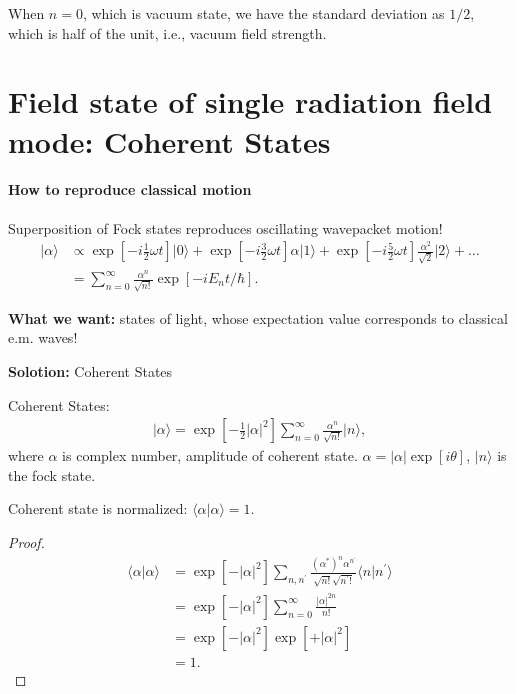 \documentclass[../../note.tex]{subfiles}
\begin{document}
When $n = 0$, which is vacuum state, we have the standard deviation as $1/2$, which is half of the unit, i.e., vacuum field strength.

\section{Field state of single radiation field mode: Coherent States}
\paragraph{How to reproduce classical motion}
Superposition of Fock states reproduces oscillating wavepacket motion! 
\begin{align}
    \vert \alpha \rangle 
    &\propto \exp[-i\frac{1}{2} \omega t] \vert 0 \rangle +  \exp[-i\frac{3}{2} \omega t] \alpha \vert 1 \rangle +
    \exp[-i\frac{5}{2} \omega t] \frac{\alpha^2}{\sqrt{2}}\vert 2 \rangle + \dots \\
    &= \sum_{n=0}^{\infty} \frac{\alpha^n}{\sqrt{n !}} \exp\left[-i E_n t / \hbar \right].
\end{align}

\textbf{What we want:} states of light, whose expectation value corresponds to classical e.m. waves!

\textbf{Solotion:} Coherent States
\begin{definition}
    Coherent States:
    \begin{align}
        \vert \alpha \rangle = \exp\left[-\frac{1}{2} \vert \alpha \vert^2 \right] \sum_{n=0}^{\infty} \frac{\alpha^n}{\sqrt{n !}} \vert n \rangle,
    \end{align}
    where $\alpha$ is complex number, amplitude of coherent state. $\alpha = \vert \alpha \vert \exp[i \theta]$, $\vert n \rangle$ is the fock state.
\end{definition}

\begin{lemma}
    Coherent state is normalized: $\langle \alpha \vert \alpha \rangle = 1$.
\end{lemma}
\begin{proof}
    \begin{align}
        \langle \alpha \vert \alpha \rangle
        &= \exp\left[- \vert \alpha \vert^2 \right] \sum_{n, n^\prime} \frac{(\alpha^\ast)^n \alpha^{n^\prime}}{ \sqrt{n!} \sqrt{n^\prime !}} \langle n \vert n^\prime \rangle \\
        &= \exp\left[-\vert \alpha \vert^2 \right] \sum_{n=0}^{\infty} \frac{\vert \alpha \vert^{2 n}}{n !} \\
        &= \exp\left[-\vert \alpha \vert^2 \right] \exp\left[+ \vert \alpha \vert^2 \right] \\
        &= 1.
    \end{align}
\end{proof}
\end{document}
